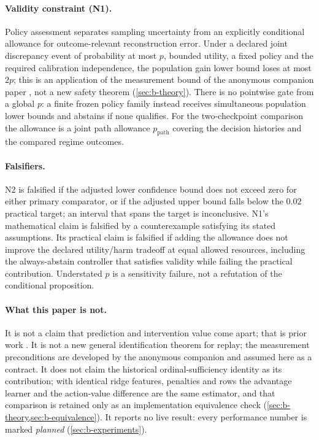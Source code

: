 \paragraph{Validity constraint (N1).}
Policy assessment separates sampling uncertainty from an explicitly conditional
allowance for outcome-relevant reconstruction error.  Under a declared joint
discrepancy event of probability at most $p$, bounded utility, a fixed policy
and the required calibration independence, the population gain lower bound loses
at most $2p$; this is an application of the measurement bound of the anonymous
companion paper \citep{companion2026}, not a new safety theorem
(\cref{sec:b-theory}).  There is no
pointwise gate from a global $p$: a finite frozen policy family instead receives
simultaneous population lower bounds and abstains if none qualifies.  For the
two-checkpoint comparison the allowance is a joint path allowance $p_{\text{path}}$
covering the decision histories and the compared regime outcomes.

\paragraph{Falsifiers.}
N2 is falsified if the adjusted lower confidence bound does not exceed zero for
either primary comparator, or if the adjusted upper bound falls below the
$0.02$ practical target; an interval that spans the target is inconclusive.
N1's mathematical claim is falsified by a counterexample satisfying its stated
assumptions.  Its practical claim is falsified if adding the allowance does not
improve the declared utility/harm tradeoff at equal allowed resources, including
the always-abstain controller that satisfies validity while failing the
practical contribution.  Understated $p$ is a sensitivity failure, not a
refutation of the conditional proposition.

\paragraph{What this paper is not.}
It is not a claim that prediction and intervention value come apart; that is
prior work \citep{interventionparadox2026,calibrationnotcontrol2026}.  It is not
a new general identification theorem for replay; the measurement preconditions
are developed by the anonymous companion and assumed here as a contract.  It
does not claim the historical ordinal-sufficiency identity as its contribution;
with identical ridge features, penalties and rows the advantage learner and the
action-value difference are the same estimator, and that comparison is retained
only as an implementation equivalence check
(\cref{sec:b-theory,sec:b-equivalence}).  It reports no live result: every
performance number is marked \emph{planned}
(\cref{sec:b-experiments}).

